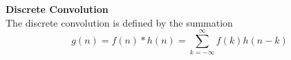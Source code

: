  \textbf{Discrete Convolution}\\
 

The discrete convolution is defined by the summation
$$
g(n)= f(n)\ast h(n) = \sum_{k=-\infty}^{\infty}f(k)h(n-k)
$$
